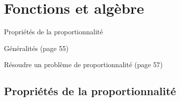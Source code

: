 \documentclass[a4paper,11pt]{report}
\begin{document}
\newcommand{\chapterName}{Fonctions et algèbre}
\newcommand{\serieName}{Propriétés de la proportionnalité}


\chapter*{\chapterName}
\thispagestyle{empty}

\begin{amL}{\serieName}{
\item Généralités (page 55)
\item Résoudre un problème de proportionnalité (page 57)}
\end{amL}
\section*{\serieName}
\setcounter{page}{1}
\thispagestyle{firstPage}
\end{document}
